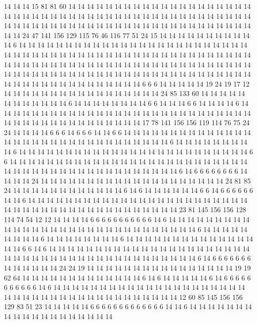 14 14 14 15 81 81 60 14 14 14 14 14 14 14 14 14 14 14 14 14
14 14 14 14 14 14 14 14 14 14 14 14 14 14 14 14 14 14 14 14
14 14 14 14 14 14 14 14 14 14 14 14 14 14 14 14 14 14 14 14
14 14 14 14 14 14 14 14 14 14 14 14 14 14 14 14 14 14 14 14
14 14 14 24 47 141 156 129 115 76 46 116 77 51 24 15 14 14 14 14
14 14 14 14 14 14 14 6 14 14 14 14 14 14 14 14 14 14 14 14
14 14 14 14 14 14 14 14 14 14 14 14 14 14 14 14 14 14 14 14
14 14 14 14 14 14 14 14 14 14 14 14 14 14 14 14 14 14 14 14
14 14 14 14 14 14 14 14 14 14 14 14 14 14 14 14 14 14 14 14
14 14 14 14 14 14 14 14 14 14 14 14 14 14 14 14 14 14 14 14
14 14 14 14 14 14 14 14 14 14 14 14 14 14 14 14 14 14 14 14
14 14 14 14 14 14 14 14 14 6 6 6 14 14 14 14 14 19 24 19
17 12 14 14 14 14 14 14 14 14 14 14 14 14 14 14 14 14 14 24
85 133 60 14 14 14 14 14 14 14 14 14 14 14 14 6 14 14 14 14
14 14 14 14 6 6 14 14 14 6 6 14 14 14 14 6 14 14 14 14
14 14 14 14 14 14 14 14 14 14 14 14 14 14 14 14 14 14 14 14
14 14 14 14 14 14 14 14 14 14 14 14 14 14 14 14 14 14 14 17
78 141 156 156 119 114 76 75 24 24 14 14 14 14 6 6 6 14 6 6
6 14 14 6 6 14 14 14 14 14 14 14 14 14 14 14 14 14 14 14
14 14 14 14 14 14 14 14 14 14 14 14 14 14 14 14 14 6 14 14
14 14 14 14 14 14 14 6 14 14 14 14 14 14 14 14 14 14 14 14
14 14 14 14 14 14 14 14 14 14 14 14 14 6 6 14 14 14 14 14
14 14 14 14 14 14 14 14 14 14 14 14 14 14 14 14 14 14 14 14
14 14 14 14 14 14 14 14 14 14 14 14 14 14 14 14 14 14 14 14
6 14 6 6 6 6 6 6 6 6 14 14 14 14 24 14 14 14 14 14
14 14 14 14 14 14 14 14 14 14 14 14 14 14 14 24 81 85 24 14
14 14 14 14 14 14 14 14 14 14 14 6 14 6 14 14 14 14 14 14
6 6 14 6 6 6 6 6 6 14 14 6 14 14 14 14 14 14 14 14
14 14 14 14 14 14 14 14 14 14 14 14 14 14 14 14 14 14 14 14
14 14 14 14 14 14 14 14 14 14 14 14 14 14 14 23 81 145 156 156
128 114 74 54 12 12 14 14 14 14 6 6 6 6 6 6 6 6 6 6
6 14 6 14 14 14 14 14 14 14 14 14 14 14 14 14 14 14 14 14
14 14 14 14 14 14 14 14 14 14 14 14 14 6 14 14 14 14 14 14
14 14 14 6 14 14 14 14 14 14 14 14 6 14 14 14 14 14 14 14
14 14 14 14 14 14 14 14 14 6 6 14 6 14 14 14 14 14 14 14
14 14 14 14 14 14 14 14 14 14 14 14 14 14 14 14 14 14 14 14
14 14 14 14 14 14 14 14 14 14 14 14 14 14 14 14 6 14 6 6
6 6 6 6 6 14 14 14 14 14 14 24 24 19 14 14 14 14 14 14
14 14 14 14 14 14 14 14 14 14 19 19 62 64 14 14 14 14 14 14
14 14 14 14 14 14 14 6 14 6 14 14 14 14 14 6 14 6 6 6
6 6 6 6 6 6 6 6 14 6 14 14 14 14 14 14 14 14 14 14
14 14 14 14 14 14 14 14 14 14 14 14 14 14 14 14 14 14 14 14
14 14 14 14 14 14 14 14 14 14 12 60 85 145 156 156 129 83 51 23
14 14 14 14 14 6 6 6 6 6 6 6 6 6 6 6 6 6 14 14
6 14 14 14 14 14 14 14 14 14 14 14 14 14 14 14 14 14 14 14
